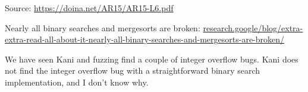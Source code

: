 Source: \url{https://doina.net/AR15/AR15-L6.pdf}

Nearly all binary searches and mergesorts are broken: \url{research.google/blog/extra-extra-read-all-about-it-nearly-all-binary-searches-and-mergesorts-are-broken/}

We have seen Kani and fuzzing find a couple of integer overflow bugs. Kani does not find the integer overflow bug with a straightforward binary search implementation, and I don't know why.
